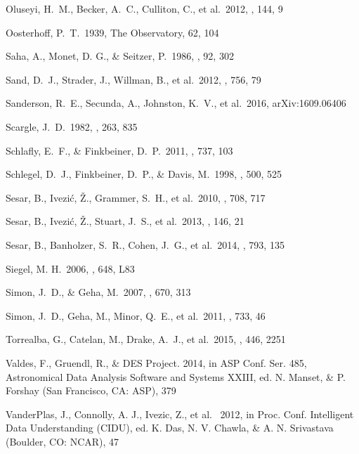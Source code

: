 \documentclass[iop]{emulateapj}
\begin{document}
\begin{thebibliography}{}
 Oluseyi, H.~M., Becker, A.~C., Culliton, C., et al.\ 2012, \aj, 144, 9 

 Oosterhoff, P.~T.\ 1939, The Observatory, 62, 104 

 Saha, A., Monet, D. G., \& Seitzer, P.\ 1986, \aj, 92, 302

 Sand, D.~J., Strader, J., Willman, B., et al.\ 2012, \apj, 756, 79 

 Sanderson, R.~E., Secunda, A., Johnston, K.~V., et al.\ 2016, arXiv:1609.06406 

 Scargle, J.~D.\ 1982, \apj, 263, 835 

 Schlafly, E.~F., \& Finkbeiner, D.~P.\ 2011, \apj, 737, 103 

 Schlegel, D.~J., Finkbeiner, D.~P., \& Davis, M.\ 1998, \apj, 500, 525 

 Sesar, B., Ivezi{\'c}, 
{\v Z}., Grammer, S.~H., et al.\ 2010, \apj, 708, 717

 Sesar, B., Ivezi{\'c}, {\v Z}., Stuart, J.~S., et al.\ 2013, \aj, 146, 21 

 Sesar, B., Banholzer, S.~R., Cohen, J.~G., et al.\ 2014, \apj, 793, 135 

 Siegel, M. H.\ 2006, \apj, 648, L83

 Simon, J.~D., \& Geha, M.\ 2007, \apj, 670, 313 

 Simon, J.~D., Geha, M., Minor, Q.~E., et al.\ 2011, \apj, 733, 46 

 Torrealba, G., Catelan, M., Drake, A.~J., et al.\ 2015, \mnras, 446, 2251 

 Valdes, F., Gruendl, R., \& DES Project. 2014, in ASP Conf. Ser. 485, Astronomical Data Analysis Software and Systems XXIII, ed. N. Manset, \& P. Forshay (San Francisco, CA: ASP), 379

VanderPlas, J., Connolly, A. J., Ivezic, Z., et al. \ 2012, in Proc. Conf. Intelligent Data Understanding (CIDU), ed. K. Das, N. V. Chawla, \& A. N. Srivastava (Boulder, CO: NCAR), 47


\end{thebibliography}
\end{document}

